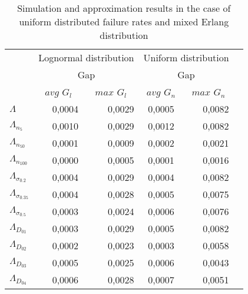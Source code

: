 \documentclass[preprint,12pt]{elsarticle}
\begin{document}
\begin{table}[htbp]
  \centering
  \caption{Simulation and approximation results in the case of uniform distributed failure rates and mixed Erlang distribution}
 \begin{tabular}{lrrcrr}
     \toprule
         & \multicolumn{2}{c}{Lognormal distribution} & \multicolumn{2}{c}{Uniform distribution} \\
          & \multicolumn{2}{c}{Gap} & \multicolumn{2}{c}{Gap} \\
          & \multicolumn{1}{c}{$avg$ $G_{l}$} & \multicolumn{1}{c}{$max$ $G_{l}$} & \multicolumn{1}{c}{$avg$ $G_{n}$} & \multicolumn{1}{c}{$max$ $G_{n}$} \\
     \midrule
    $\Lambda$  & 0,0004 & 0,0029 & 0,0005 & 0,0082 \\
     $\Lambda_{n_{5}}$ & 0,0010 & 0,0029 & 0,0012 & 0,0082 \\
    $\Lambda_{n_{50}}$ & 0,0001 & 0,0009 & 0,0002 & 0,0021 \\
    $\Lambda_{n_{100}}$ & 0,0000 & 0,0005 & 0,0001 & 0,0016 \\
    $\Lambda_{\sigma_{0.2}}$ & 0,0004 & 0,0029 & 0,0004 & 0,0082 \\
    $\Lambda_{\sigma_{0.35}}$ & 0,0004 & 0,0028 & 0,0005 & 0,0075 \\
   $\Lambda_{\sigma_{0.5}}$ & 0,0003 & 0,0024 & 0,0006 & 0,0076 \\
   $\Lambda_{D_{01}}$ & 0,0003 & 0,0029 & 0,0005 & 0,0082 \\
   $\Lambda_{D_{02}}$ & 0,0002 & 0,0023 & 0,0003 & 0,0058 \\
   $\Lambda_{D_{03}}$  & 0,0005 & 0,0025 & 0,0006 & 0,0043 \\
    $\Lambda_{D_{04}}$  & 0,0006 & 0,0028 & 0,0007 & 0,0051 \\
         \bottomrule
     \end{tabular}%
  \label{generalapptable}%
 \end{table}%
\end{document}
